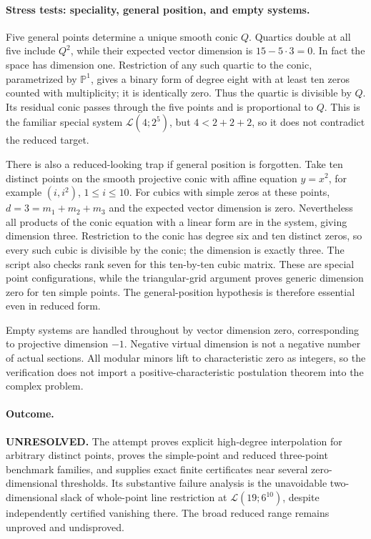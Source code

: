 \documentclass[11pt]{article}
\begin{document}
\paragraph{Stress tests: speciality, general position, and empty systems.}
Five general points determine a unique smooth conic $Q$. Quartics double
at all five include $Q^2$, while their expected vector dimension is
$15-5\cdot3=0$. In fact the space has dimension one. Restriction of any
such quartic to the conic, parametrized by $\mathbb P^1$, gives a binary
form of degree eight with at least ten zeros counted with multiplicity;
it is identically zero. Thus the quartic is divisible by $Q$. Its residual
conic passes through the five points and is proportional to $Q$. This is
the familiar special system $\mathcal L(4;2^5)$, but $4<2+2+2$, so it
does not contradict the reduced target.

There is also a reduced-looking trap if general position is forgotten.
Take ten distinct points on the smooth projective conic with affine equation
$y=x^2$, for example $(i,i^2)$, $1\leq i\leq10$. For cubics with
simple zeros at these points, $d=3=m_1+m_2+m_3$ and the expected vector
dimension is zero. Nevertheless all products of the conic equation with
a linear form are in the system, giving dimension three. Restriction to
the conic has degree six and ten distinct zeros, so every such cubic is
divisible by the conic; the dimension is exactly three. The script also
checks rank seven for this ten-by-ten cubic matrix. These are special
point configurations, while the triangular-grid argument proves generic
dimension zero for ten simple points. The general-position hypothesis is
therefore essential even in reduced form.

Empty systems are handled throughout by vector dimension zero, corresponding
to projective dimension $-1$. Negative virtual dimension is not a negative
number of actual sections. All modular minors lift to characteristic zero
as integers, so the verification does not import a positive-characteristic
postulation theorem into the complex problem.

\paragraph{Outcome.}
\textbf{UNRESOLVED.} The attempt proves explicit high-degree interpolation
for arbitrary distinct points, proves the simple-point and reduced
three-point benchmark families, and supplies exact finite certificates near
several zero-dimensional thresholds. Its substantive failure analysis is
the unavoidable two-dimensional slack of whole-point line restriction at
$\mathcal L(19;6^{10})$, despite independently certified vanishing there.
The broad reduced range remains unproved and undisproved.
\end{document}
